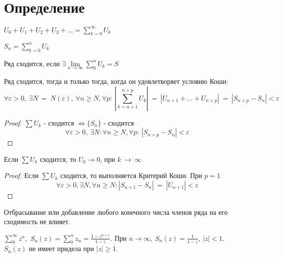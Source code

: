 \section{Определение}

\begin{definition}
  $U_0 + U_1 + U_2 + U_3 + \dots = \sum\limits_{k = 0}^{\infty}{U_k}$
\end{definition}

\begin{definition}
  $S_n = \sum\limits_{k = 0}^n U_k$
\end{definition}

\begin{definition}
  Ряд сходится, если $\exists \lim\limits_{n \to \infty}
                      \sum\limits_0^n U_k = S$
\end{definition}

\begin{theorem}
  \label{th111}
  Ряд сходится, тогда и только тогда, когда он удовлетворяет условию Коши: \\
  $$\forall \varepsilon > 0, \ \exists N~=~N(\varepsilon), \
  \forall n \geq N, \forall p: \ |\sum\limits_{k=n+1}^{n+p} U_k|~=~|U_{n+1}
  + \dots + U_{n+p}|~=~|S_{n+p} - S_{n}| < \varepsilon$$
\end{theorem}

\begin{proof}
  $\sum U_k$ - сходится $\Leftrightarrow \{S_n\}$ - сходится
  $$\forall \varepsilon > 0, \ \exists N: \forall n \geq N, \forall p: \
  |S_{n+p} - S_{n}| < \varepsilon$$
\end{proof}
\begin{consequence}
  Если $\sum U_k$ сходится, то $U_k \to 0$, при $k~\to~\infty$
\end{consequence}
\begin{proof}
  Если $\sum U_k$ сходится, то выполняется Критерий Коши. При $p = 1$
  $$\forall \varepsilon > 0, \exists N, \forall n \geq N:
  |S_{n+1} - S_n|~=~|U_{n+1}| < \varepsilon$$
\end{proof}
\begin{consequence}
  Отбрасывание или добавление любого конечного числа членов ряда на его
  сходимость не влияет.
\end{consequence}

\begin{example}
  $\sum\limits_0^\infty z^n,$
  $S_n(z) = \sum\limits_0^n z_n = \frac{1-z^{n+1}}{1-z}$.
  При $n \to \infty, \ S_n(z) = \frac{1}{1 - z}, \ |z| < 1$. \\
  $S_n(z)$ не имеет придела при $|z| \geq 1$.
\end{example}

